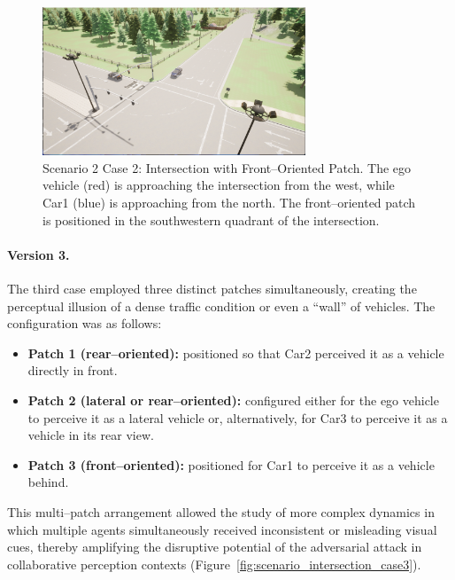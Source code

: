 \begin{figure}[H]
    \centering
    \includegraphics[width=0.7\textwidth]{figures/experiments/scenario2_v2.png}
    \caption{Scenario 2 Case 2: Intersection with Front–Oriented Patch. The ego vehicle (red) is approaching the intersection from the west, while Car1 (blue) is approaching from the north. The front–oriented patch is positioned in the southwestern quadrant of the intersection.}
    \label{fig:scenario_intersection_case2}
\end{figure}

\paragraph{Version 3.}  
The third case employed three distinct patches simultaneously, creating the perceptual illusion of a dense traffic condition or even a “wall” of vehicles. The configuration was as follows:  
\begin{itemize}
    \item \textbf{Patch 1 (rear–oriented):} positioned so that Car2 perceived it as a vehicle directly in front.  
    \item \textbf{Patch 2 (lateral or rear–oriented):} configured either for the ego vehicle to perceive it as a lateral vehicle or, alternatively, for Car3 to perceive it as a vehicle in its rear view.  
    \item \textbf{Patch 3 (front–oriented):} positioned for Car1 to perceive it as a vehicle behind.  
\end{itemize}  
This multi–patch arrangement allowed the study of more complex dynamics in which multiple agents simultaneously received inconsistent or misleading visual cues, thereby amplifying the disruptive potential of the adversarial attack in collaborative perception contexts (Figure~\ref{fig:scenario_intersection_case3}).

